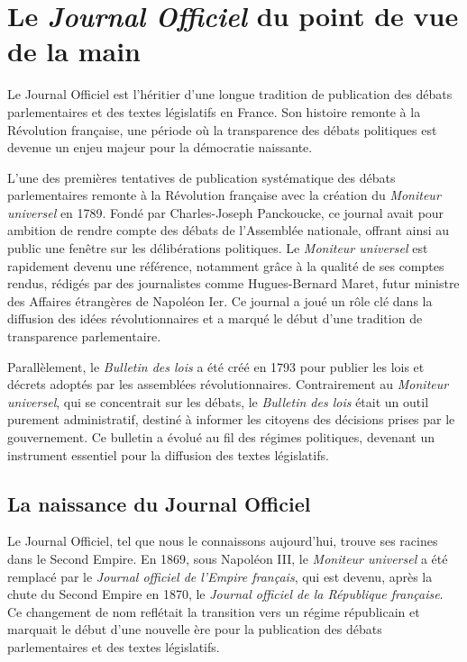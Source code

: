 \section{Le \emph{Journal Officiel} du point de vue de la main}

Le Journal Officiel est l'héritier d'une longue tradition de publication des débats parlementaires et des textes législatifs en France. Son histoire remonte à la Révolution française, une période où la transparence des débats politiques est devenue un enjeu majeur pour la démocratie naissante.

L'une des premières tentatives de publication systématique des débats parlementaires remonte à la Révolution française avec la création du \emph{Moniteur universel} en 1789. Fondé par Charles-Joseph Panckoucke, ce journal avait pour ambition de rendre compte des débats de l'Assemblée nationale, offrant ainsi au public une fenêtre sur les délibérations politiques. Le \emph{Moniteur universel} est rapidement devenu une référence, notamment grâce à la qualité de ses comptes rendus, rédigés par des journalistes comme Hugues-Bernard Maret, futur ministre des Affaires étrangères de Napoléon Ier. Ce journal a joué un rôle clé dans la diffusion des idées révolutionnaires et a marqué le début d'une tradition de transparence parlementaire.

Parallèlement, le \emph{Bulletin des lois} a été créé en 1793 pour publier les lois et décrets adoptés par les assemblées révolutionnaires. Contrairement au \emph{Moniteur universel}, qui se concentrait sur les débats, le \emph{Bulletin des lois} était un outil purement administratif, destiné à informer les citoyens des décisions prises par le gouvernement. Ce bulletin a évolué au fil des régimes politiques, devenant un instrument essentiel pour la diffusion des textes législatifs.

\subsection{La naissance du Journal Officiel}

Le Journal Officiel, tel que nous le connaissons aujourd'hui, trouve ses racines dans le Second Empire. En 1869, sous Napoléon III, le \emph{Moniteur universel} a été remplacé par le \emph{Journal officiel de l'Empire français}, qui est devenu, après la chute du Second Empire en 1870, le \emph{Journal officiel de la République française}. Ce changement de nom reflétait la transition vers un régime républicain et marquait le début d'une nouvelle ère pour la publication des débats parlementaires et des textes législatifs.

